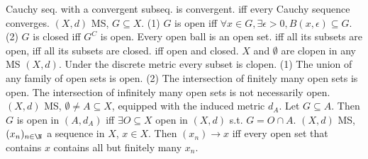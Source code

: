  Cauchy seq. with a convergent subseq. is convergent.
 iff every Cauchy sequence converges.
$(X,d)$ MS, $G \subseteq X$.
(1) $G$ is open iff $\forall x \in G, \exists \epsilon > 0, B(x,\epsilon) \subseteq G$.
(2) $G$ is closed iff $G^C$ is open.
 Every open ball is an open set.
 iff all its subsets are open,
iff all its subsets are closed.
 iff open and closed.
 $X$ and $\emptyset$ are clopen in any MS $(X, d)$.
 Under the discrete metric every subset is clopen.
(1) The union of any family of open sets is open.
(2) The intersection of finitely many open sets is open.
 The intersection of infinitely many open sets
is not necessarily open.
 $(X, d)$ MS, $\emptyset \neq A \subseteq X$,
equipped with the induced metric $d_A$.
Let $G \subseteq A$.
Then $G$ is open in $(A, d_A)$ iff
$\exists O \subseteq X$ open in $(X,d)$ s.t. $G = O \cap A$.
$(X,d)$ MS, $(x_n)_{n \in \N}$ a sequence in $X$, $x \in X$.
Then $(x_n) \to x$ iff every open set that contains $x$
contains all but finitely many $x_n$.
